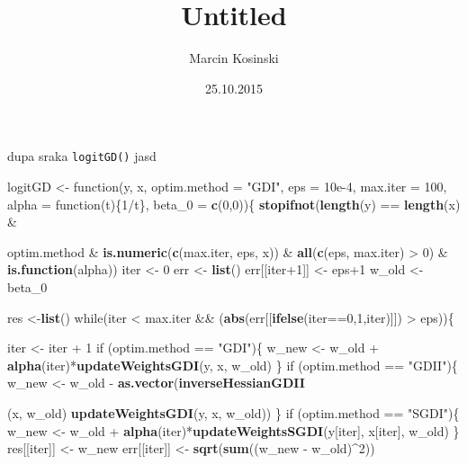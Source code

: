 \documentclass[]{article}
\title{Untitled}
\author{Marcin Kosinski}
\date{25.10.2015}
\newenvironment{Shaded}{\begin{snugshade}}{\end{snugshade}}
\newcommand{\KeywordTok}[1]{\textcolor[rgb]{0.13,0.29,0.53}{\textbf{{#1}}}}
\newcommand{\DataTypeTok}[1]{\textcolor[rgb]{0.13,0.29,0.53}{{#1}}}
\newcommand{\DecValTok}[1]{\textcolor[rgb]{0.00,0.00,0.81}{{#1}}}
\newcommand{\FloatTok}[1]{\textcolor[rgb]{0.00,0.00,0.81}{{#1}}}
\newcommand{\StringTok}[1]{\textcolor[rgb]{0.31,0.60,0.02}{{#1}}}
\newcommand{\NormalTok}[1]{{#1}}
\begin{document}
\maketitle


dupa sraka \texttt{logitGD()} jasd

\begin{Shaded}
\begin{Highlighting}[]
\NormalTok{logitGD <-}\StringTok{ }\NormalTok{function(y, x, }\DataTypeTok{optim.method =} \StringTok{"GDI"}\NormalTok{, }\DataTypeTok{eps =} \FloatTok{10e-4}\NormalTok{,}
                    \DataTypeTok{max.iter =} \DecValTok{100}\NormalTok{, }\DataTypeTok{alpha =} \NormalTok{function(t)\{}\DecValTok{1}\NormalTok{/t\}, }\DataTypeTok{beta_0 =} \KeywordTok{c}\NormalTok{(}\DecValTok{0}\NormalTok{,}\DecValTok{0}\NormalTok{))\{}
  \KeywordTok{stopifnot}\NormalTok{(}\KeywordTok{length}\NormalTok{(y) ==}\StringTok{ }\KeywordTok{length}\NormalTok{(x) &}\StringTok{ }\NormalTok{optim.method %in%}\StringTok{ }\KeywordTok{c}\NormalTok{(}\StringTok{"GDI"}\NormalTok{, }\StringTok{"GDII"}\NormalTok{, }\StringTok{"SGDI"}\NormalTok{)}
            \NormalTok{&}\StringTok{ }\KeywordTok{is.numeric}\NormalTok{(}\KeywordTok{c}\NormalTok{(max.iter, eps, x)) &}\StringTok{ }\KeywordTok{all}\NormalTok{(}\KeywordTok{c}\NormalTok{(eps, max.iter) >}\StringTok{ }\DecValTok{0}\NormalTok{) &}
\StringTok{              }\KeywordTok{is.function}\NormalTok{(alpha))}
  \NormalTok{iter <-}\StringTok{ }\DecValTok{0}
  \NormalTok{err <-}\StringTok{ }\KeywordTok{list}\NormalTok{()}
  \NormalTok{err[[iter}\DecValTok{+1}\NormalTok{]] <-}\StringTok{ }\NormalTok{eps}\DecValTok{+1}
  \NormalTok{w_old <-}\StringTok{ }\NormalTok{beta_0}

  \NormalTok{res <-}\KeywordTok{list}\NormalTok{()}
  \NormalTok{while(iter <}\StringTok{ }\NormalTok{max.iter &&}\StringTok{ }\NormalTok{(}\KeywordTok{abs}\NormalTok{(err[[}\KeywordTok{ifelse}\NormalTok{(iter==}\DecValTok{0}\NormalTok{,}\DecValTok{1}\NormalTok{,iter)]]) >}\StringTok{ }\NormalTok{eps))\{}

    \NormalTok{iter <-}\StringTok{ }\NormalTok{iter +}\StringTok{ }\DecValTok{1}
    \NormalTok{if (optim.method ==}\StringTok{ "GDI"}\NormalTok{)\{}
      \NormalTok{w_new <-}\StringTok{ }\NormalTok{w_old +}\StringTok{ }\KeywordTok{alpha}\NormalTok{(iter)*}\KeywordTok{updateWeightsGDI}\NormalTok{(y, x, w_old)}
    \NormalTok{\}}
    \NormalTok{if (optim.method ==}\StringTok{ "GDII"}\NormalTok{)\{}
      \NormalTok{w_new <-}\StringTok{ }\NormalTok{w_old -}\StringTok{ }\KeywordTok{as.vector}\NormalTok{(}\KeywordTok{inverseHessianGDII}\NormalTok{(x, w_old)%*%}
\StringTok{                                   }\KeywordTok{updateWeightsGDI}\NormalTok{(y, x, w_old))}
    \NormalTok{\}}
    \NormalTok{if (optim.method ==}\StringTok{ "SGDI"}\NormalTok{)\{}
      \NormalTok{w_new <-}\StringTok{ }\NormalTok{w_old +}\StringTok{ }\KeywordTok{alpha}\NormalTok{(iter)*}\KeywordTok{updateWeightsSGDI}\NormalTok{(y[iter], x[iter], w_old)}
    \NormalTok{\}}
    \NormalTok{res[[iter]] <-}\StringTok{ }\NormalTok{w_new}
    \NormalTok{err[[iter]] <-}\StringTok{ }\KeywordTok{sqrt}\NormalTok{(}\KeywordTok{sum}\NormalTok{((w_new -}\StringTok{ }\NormalTok{w_old)^}\DecValTok{2}\NormalTok{))}

}}
\end{Highlighting}
\end{Shaded}
\end{document}
